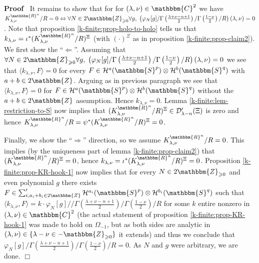 \documentclass{article}
\newenvironment{proof}{\noindent\textbf{Proof\ }}{\hspace*{\fill}$\Box$\medskip}
\numberwithin{definition}{section}
\numberwithin{lemma}{section}
\numberwithin{proposition}{section}
{\theorembodyfont{\rmfamily}\newtheorem{remark}{Remark}
\numberwithin{remark}{section}
}
\begin{document}
\begin{proof}
  It remains to show that for for $( \lambda, \nu) \in \mathbbm{C}^2$ we have
  $K_{\lambda, \nu}^{\mathbbm{R}^n} / R = 0 \Leftrightarrow \forall N \in
  2\mathbbm{Z}_{\geqslant 0} \forall g, \; \left( \varphi_N [ g] / \Gamma
  \left( \frac{\lambda + \nu - n + 1}{2} \right) / \Gamma \left( \frac{1 -
  \nu}{2} \right) / R \right) ( \lambda, \nu) = 0$. Note that proposition
  \ref{k-finite:prop-holo-to-holo} tells us that $k_{\lambda, \nu} =
  \iota^{\ast} ( K_{\lambda, \nu}^{\mathbbm{R}^n} / R)^{\Xi}$ (with $(
  \cdot)^{\Xi}$ as in proposition \ref{k-finite:prop-claim2}). We first show
  the ``$\Leftarrow$''. Assuming that $\forall N \in 2\mathbbm{Z}_{\geqslant
  0} \forall g, \; \left( \varphi_N [ g] / \Gamma \left( \frac{\lambda + \nu -
  n + 1}{2} \right) / \Gamma \left( \frac{1 - \nu}{2} \right) / R \right) (
  \lambda, \nu) = 0$ we see that $\langle k_{\lambda, \nu}, F \rangle = 0$ for
  every $F \in \mathcal{H}^a ( \mathbbm{S}^p) \otimes \mathcal{H}^b (
  \mathbbm{S}^q)$ with $a + b \in 2\mathbbm{Z}$. Arguing as in previous
  paragraph we see that $\langle k_{\lambda, \nu}, F \rangle = 0$ for $F \in
  \mathcal{H}^a ( \mathbbm{S}^p) \otimes \mathcal{H}^b ( \mathbbm{S}^q)$
  without the $a + b \in 2\mathbbm{Z}$ assumption. Hence $k_{\lambda, \nu} =
  0$. Lemma \ref{k-finite:lem-restriction-to-S} now implies that $(
  K_{\lambda, \nu}^{\mathbbm{R}^n} / R)^{\Xi} \in \mathcal{D}'_{\lambda - n} (
  \Xi)$ is zero and hence $K_{\lambda, \nu}^{\mathbbm{R}^n} / R = \psi^{\ast}
  ( K_{\lambda, \nu}^{\mathbbm{R}^n} / R)^{\Xi} = 0$.
  
  Finally, we show the ``$\Rightarrow$'' direction, so we assume $K_{\lambda,
  \nu}^{\mathbbm{R}^n} / R = 0$. This implies (by the uniqueness part of lemma
  \ref{k-finite:prop-claim2}) that $( K_{\lambda, \nu}^{\mathbbm{R}^n} /
  R)^{\Xi} = 0$, hence $k_{\lambda, \nu} = \iota^{\ast} ( K_{\lambda,
  \nu}^{\mathbbm{R}^n} / R)^{\Xi} = 0$. Proposition
  \ref{k-finite:prop-KR-hook-1} now implies that for every $N \in
  2\mathbbm{Z}_{\geqslant 0}$ and even polynomial $g$ there exists $F \in
  \sum_{i, a_i + b_i \in 2\mathbbm{Z}}' \mathcal{H}^{a_i} ( \mathbbm{S}^p)
  \otimes \mathcal{H}^{b_i} ( \mathbbm{S}^q)$ such that $\langle k_{\lambda,
  \nu}^{}, F \rangle = k \cdot \varphi_N [ g] / / \Gamma \left( \frac{\lambda
  + \nu - n + 1}{2} \right) / \Gamma \left( \frac{1 - \nu}{2} \right) / R$ for
  some $k$ entire nonzero in $( \lambda, \nu) \in \mathbbm{C}^2$ (the actual
  statement of proposition \ref{k-finite:prop-KR-hook-1} was made to hold on
  $\Omega_{- 1}$, but as both sides are analytic in $( \lambda, \nu) \in \{
  \lambda - \nu \in -\mathbbm{Z}_{\geqslant 0} \}$ it extends) and thus we
  conclude that $\varphi_N [ g] / \Gamma \left( \frac{\lambda + \nu - n +
  1}{2} \right) / \Gamma \left( \frac{1 - \nu}{2} \right) / R = 0$. As $N$ and
  $g$ were arbitrary, we are done.
\end{proof}
\end{document}
